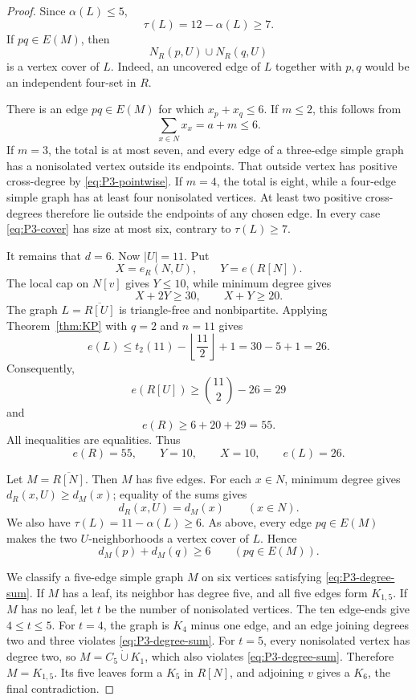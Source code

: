 \documentclass[11pt,reqno,a4paper]{amsart}
\theoremstyle{definition}
\theoremstyle{remark}
\newcommand{\comp}[1]{\overline{#1}}
\begin{document}
\begin{proof}
Since $\alpha(L)\leq5$,
\[
  \tau(L)=12-\alpha(L)\geq7.
\]
If $pq\in E(M)$, then
\begin{equation}\label{eq:P3-cover}
  N_R(p,U)\cup N_R(q,U)
\end{equation}
is a vertex cover of $L$.  Indeed, an uncovered edge of $L$ together with
$p,q$ would be an independent four-set in $R$.

There is an edge $pq\in E(M)$ for which $x_p+x_q\leq6$.  If $m\leq2$,
this follows from
\[
  \sum_{x\in N}x_x=a+m\leq6.
\]
If $m=3$, the total is at most seven, and every edge of a three-edge simple
graph has a nonisolated vertex outside its endpoints.  That outside vertex
has positive cross-degree by \eqref{eq:P3-pointwise}.  If $m=4$, the total
is eight, while a four-edge simple graph has at least four nonisolated
vertices.  At least two positive cross-degrees therefore lie outside the
endpoints of any chosen edge.  In every case \eqref{eq:P3-cover} has size at
most six, contrary to $\tau(L)\geq7$.

It remains that $d=6$.  Now $|U|=11$.  Put
\[
  X=e_R(N,U),\qquad Y=e(R[N]).
\]
The local cap on $N[v]$ gives $Y\leq10$, while minimum degree gives
\[
  X+2Y\geq30,
  \qquad X+Y\geq20.
\]
The graph $L=\comp{R[U]}$ is triangle-free and nonbipartite.  Applying
Theorem~\ref{thm:KP} with $q=2$ and $n=11$ gives
\[
  e(L)\leq t_2(11)-\left\lfloor\frac{11}{2}\right\rfloor+1
  =30-5+1=26.
\]
Consequently,
\[
  e(R[U])\geq\binom{11}{2}-26=29
\]
and
\[
  e(R)\geq6+20+29=55.
\]
All inequalities are equalities.  Thus
\[
  e(R)=55,\qquad Y=10,\qquad X=10,\qquad e(L)=26.
\]

Let $M=\comp{R[N]}$.  Then $M$ has five edges.  For each $x\in N$,
minimum degree gives $d_R(x,U)\geq d_M(x)$; equality of the sums gives
\begin{equation}\label{eq:P3-cross-equality}
  d_R(x,U)=d_M(x)
  \qquad(x\in N).
\end{equation}
We also have $\tau(L)=11-\alpha(L)\geq6$.  As above, every edge $pq\in E(M)$
makes the two $U$-neighborhoods a vertex cover of $L$.  Hence
\begin{equation}\label{eq:P3-degree-sum}
  d_M(p)+d_M(q)\geq6
  \qquad(pq\in E(M)).
\end{equation}

We classify a five-edge simple graph $M$ on six vertices satisfying
\eqref{eq:P3-degree-sum}.  If $M$ has a leaf, its neighbor has degree five,
and all five edges form $K_{1,5}$.  If $M$ has no leaf, let $t$ be the
number of nonisolated vertices.  The ten edge-ends give $4\leq t\leq5$.
For $t=4$, the graph is $K_4$ minus one edge, and an edge joining degrees
two and three violates \eqref{eq:P3-degree-sum}.  For $t=5$, every
nonisolated vertex has degree two, so $M=C_5\mathbin{\dot\cup}K_1$, which
also violates \eqref{eq:P3-degree-sum}.  Therefore $M=K_{1,5}$.  Its five
leaves form a $K_5$ in $R[N]$, and adjoining $v$ gives a $K_6$, the final
contradiction.
\end{proof}
\end{document}
